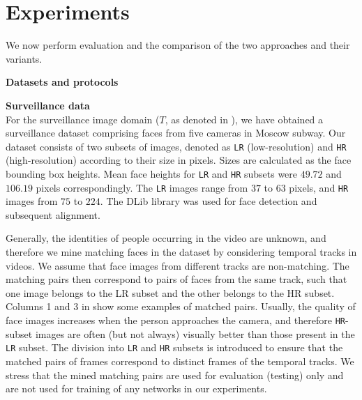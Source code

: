 \section{Experiments}
\label{sect:experiments}

We now perform evaluation and the comparison of the two approaches and their variants. 


\bigskip\indent\textbf{Datasets and protocols} 

\label{sect:datasets}

\bigskip\indent\textbf{Surveillance data}\\
\label{sect:surveillance}
For the surveillance image domain ($T$, as denoted in ), we have obtained a surveillance dataset comprising faces from five cameras in Moscow subway. Our dataset consists of two subsets of images, denoted as \texttt{LR} (low-resolution) and \texttt{HR} (high-resolution) according to their size in pixels. Sizes are calculated as the face bounding box heights. Mean face heights for \texttt{LR} and \texttt{HR} subsets were $49.72$ and $106.19$ pixels correspondingly. The \texttt{LR} images range from $37$ to $63$ pixels, and \texttt{HR} images from $75$ to $224$. The DLib \cite{dlib09} library was used for face detection and subsequent alignment. 
 
Generally, the identities of people occurring in the video are unknown, and therefore we mine matching faces in the dataset by considering temporal tracks in videos. We assume that face images from different tracks are non-matching. The matching pairs then correspond to pairs of faces from the same track, such that one image belongs to the LR subset and the other belongs to the HR subset. Columns 1 and 3 in  show some examples of matched pairs. Usually, the quality of face images increases when the person approaches the camera, and therefore \texttt{HR}-subset images are often (but not always) visually better than those present in the \texttt{LR} subset. The division into \texttt{LR} and \texttt{HR} subsets is introduced to ensure that the matched pairs of frames correspond to distinct frames of the temporal tracks. We stress that the mined matching pairs are used for evaluation (testing) only and are not used for training of any networks in our experiments.

